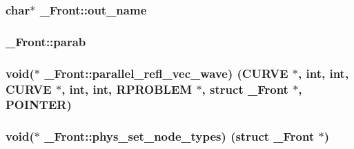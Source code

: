 \subsubsection[{\texorpdfstring{out\+\_\+name}{out_name}}]{\setlength{\rightskip}{0pt plus 5cm}char$\ast$ \+\_\+\+Front\+::out\+\_\+name}\hypertarget{struct___front_a545c70e4bb7cf17143f4e4b439162a3d}{}\label{struct___front_a545c70e4bb7cf17143f4e4b439162a3d}
\subsubsection[{\texorpdfstring{parab}{parab}}]{ \+\_\+\+Front\+::parab}\hypertarget{struct___front_a90bca36e4561020b067aabb93d4bf1b4}{}\label{struct___front_a90bca36e4561020b067aabb93d4bf1b4}
\subsubsection[{\texorpdfstring{parallel\+\_\+refl\+\_\+vec\+\_\+wave}{parallel_refl_vec_wave}}]{\setlength{\rightskip}{0pt plus 5cm}void($\ast$ \+\_\+\+Front\+::parallel\+\_\+refl\+\_\+vec\+\_\+wave) ({\bf C\+U\+R\+VE} $\ast$, int, int, {\bf C\+U\+R\+VE} $\ast$, int, int, {\bf R\+P\+R\+O\+B\+L\+EM} $\ast$, struct {\bf \+\_\+\+Front} $\ast$, {\bf P\+O\+I\+N\+T\+ER})}\hypertarget{struct___front_acf5a5d589c7b5491ebff5ded5c351fca}{}\label{struct___front_acf5a5d589c7b5491ebff5ded5c351fca}
\subsubsection[{\texorpdfstring{phys\+\_\+set\+\_\+node\+\_\+types}{phys_set_node_types}}]{\setlength{\rightskip}{0pt plus 5cm}void($\ast$ \+\_\+\+Front\+::phys\+\_\+set\+\_\+node\+\_\+types) (struct {\bf \+\_\+\+Front} $\ast$)}\hypertarget{struct___front_a6002b2ae094d22bdd97a32093ef27bbf}{}\label{struct___front_a6002b2ae094d22bdd97a32093ef27bbf}
